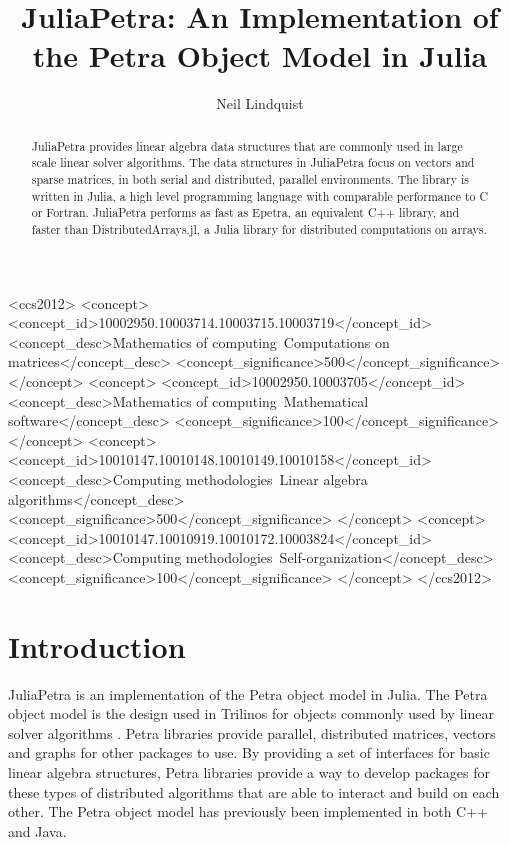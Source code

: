 \documentclass[acmsmall]{acmart}
\title{JuliaPetra: An Implementation of the Petra Object Model in Julia}
\author{Neil Lindquist}
\begin{document}
\begin{CCSXML}
<ccs2012>
	<concept>
		<concept_id>10002950.10003714.10003715.10003719</concept_id>
		<concept_desc>Mathematics of computing~Computations on matrices</concept_desc>
		<concept_significance>500</concept_significance>
	</concept>
	<concept>
		<concept_id>10002950.10003705</concept_id>
		<concept_desc>Mathematics of computing~Mathematical software</concept_desc>
		<concept_significance>100</concept_significance>
	</concept>
	<concept>
		<concept_id>10010147.10010148.10010149.10010158</concept_id>
		<concept_desc>Computing methodologies~Linear algebra algorithms</concept_desc>
		<concept_significance>500</concept_significance>
	</concept>
	<concept>
		<concept_id>10010147.10010919.10010172.10003824</concept_id>
		<concept_desc>Computing methodologies~Self-organization</concept_desc>
		<concept_significance>100</concept_significance>
	</concept>
</ccs2012>
\end{CCSXML}


\begin{abstract}
JuliaPetra provides linear algebra data structures that are commonly used in large scale linear solver algorithms.
The data structures in JuliaPetra focus on vectors and sparse matrices, in both serial and
distributed, parallel environments.
The library is written in Julia, a high level programming language with comparable performance to C or Fortran.
JuliaPetra performs as fast as Epetra, an equivalent C++ library, and faster than DistributedArrays.jl, a Julia
library for distributed computations on arrays.
\end{abstract}

\maketitle

\section{Introduction}

JuliaPetra is an implementation of the Petra object model in Julia.
The Petra object model is the design used in Trilinos for objects commonly used by linear solver algorithms
\cite{Heroux:2005:Trilinos}.
Petra libraries provide parallel, distributed matrices, vectors and graphs for other packages to use.
By providing a set of interfaces for basic linear algebra structures, Petra libraries provide a way
to develop packages for these types of distributed algorithms that are able to interact and build on each other.
The Petra object model has previously been implemented in both C++ and Java.
\end{document}
